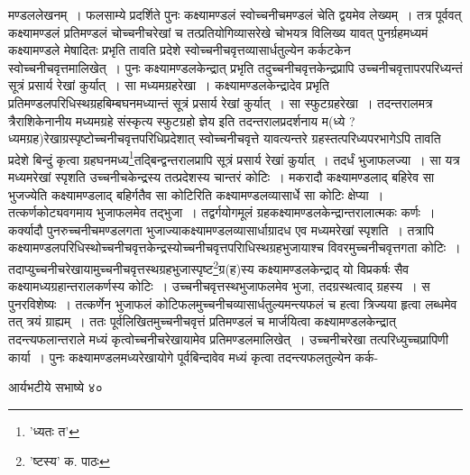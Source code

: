 \documentclass[11pt, openany]{book}
\begin{document}
{{{{{\vspace{0.3cm}
\noindent मण्डललेखनम्~। फलसाम्ये प्रदर्शिते पुनः कक्ष्यामण्डलं स्वोच्चनीचमण्डलं चेति द्वयमेव लेख्यम्~। तत्र पूर्ववत् कक्ष्यामण्डलं प्रतिमण्डलं चोच्चनीचरेखां च तत्प्रतियोगिव्यासरेखे चोभयत्र विलिख्य यावत् पुनर्ग्रहमध्यमं कक्ष्यामण्डले मेषादितः प्रभृति तावति प्रदेशे स्वोच्चनीचवृत्तव्यासार्धतुल्येन कर्कटकेन स्वोच्चनीचवृत्तमालिखेत्~। पुनः कक्ष्यामण्डलकेन्द्रात् प्रभृति तदुच्चनीचवृत्तकेन्द्रप्रापि उच्चनीचवृत्तापरपरिध्यन्तं सूत्रं प्रसार्य रेखां कुर्यात्~। सा मध्यमग्रहरेखा~। कक्ष्यामण्डलकेन्द्रादेव प्रभृति प्रतिमण्डलपरिधिस्थग्रहबिम्बघनमध्यान्तं सूत्रं प्रसार्य रेखां कुर्यात्~। सा स्फुटग्रहरेखा~। तदन्तरालमत्र त्रैराशिकेनानीय मध्यमग्रहे संस्कृत्य स्फुटग्रहो ज्ञेय इति तदन्तरालप्रदर्शनाय म(ध्ये ? ध्यमग्रह)रेखाग्रस्पृष्टोच्चनीचवृत्तपरिधिप्रदेशात् स्वोच्चनीचवृत्ते यावत्यन्तरे ग्रहस्तत्परिध्यपरभागेऽपि तावति प्रदेशे बिन्दुं कृत्वा ग्रहघनमध्य\renewcommand{\thefootnote}{१}\footnote{'ध्यतः त'}तद्बिन्द्वन्तरालप्रापि सूत्रं प्रसार्य रेखां कुर्यात्~।
तदर्धं भुजाफलज्या~। सा यत्र मध्यमरेखां स्पृशति उच्चनीचकेन्द्रस्य तत्प्रदेशस्य चान्तरं कोटिः~। मकरादौ कक्ष्यामण्डलाद् बहिरेव सा भुजज्येति कक्ष्यामण्डलाद् बहिर्गतैव सा कोटिरिति कक्ष्यामण्डलव्यासार्धे सा कोटिः क्षेप्या~। तत्कर्णकोट्यवगमाय भुजाफलमेव तद्भुजा~। तद्वर्गयोगमूलं ग्रहकक्ष्यामण्डलकेन्द्रान्तरालात्मकः कर्णः~। कर्क्यादौ पुनरुच्चनीचमण्डलगता भुजाज्याकक्ष्यामण्डलव्यासार्धाग्रादध एव मध्यमरेखां स्पृशति~। तत्रापि कक्ष्यामण्डलपरिधिस्थोच्चनीचवृत्तकेन्द्रस्योच्चनीचवृत्तपरािधिस्थग्रहभुजायाश्च विवरमुच्चनीचवृत्तगता कोटिः~। तदाप्युच्चनीचरेखायामुच्चनीचवृत्तस्थग्रहभुजास्पृष्ट\renewcommand{\thefootnote}{२}\footnote{'ष्टस्य' क. पाठः}ग्र(ह)स्य कक्ष्यामण्डलकेन्द्राद् यो विप्रकर्षः सैव कक्ष्यामध्यग्रहान्तरालकर्णस्य कोटिः~। उच्चनीचवृत्तस्थभुजाफलमेव भुजा, तदग्रस्थत्वाद्
ग्रहस्य~। स पुनरविशेष्यः~। तत्कर्णेन भुजाफलं कोटिफलमुच्चनीचव्यासार्धतुल्यमन्त्यफलं च हत्वा त्रिज्यया हृत्वा लब्धमेव तत् त्रयं
ग्राह्यम्~। ततः पूर्वलिखितमुच्चनीचवृत्तं प्रतिमण्डलं च मार्जयित्वा कक्ष्यामण्डलकेन्द्रात् तदन्त्यफलान्तराले मध्यं कृत्वोच्चनीचरेखायामेव प्रतिमण्डलमालिखेत्~। उच्चनीचरेखा तत्परिध्युच्चप्रापिणी कार्या~। पुनः कक्ष्यामण्डलमध्यरेखायोगे पूर्वबिन्दावेव मध्यं कृत्वा तदन्त्यफलतुल्येन कर्क-

\newpage

\vspace{3cm}\hspace{4cm} आर्यभटीये सभाष्ये \hspace{4cm}४०

}}}}}
\end{document}
